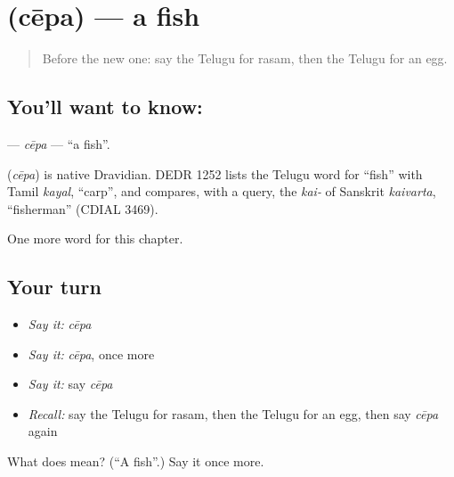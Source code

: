 \section[\texorpdfstring{\te{చేప} (cēpa)}{చేప (cēpa)}]{ (cēpa) — a fish}

\label{lesson:TE-C116-cepa}



\begin{quote}
Before the new one: say the Telugu for rasam, then the Telugu for an egg.
\end{quote}

\subsection*{You'll want to know: }
\textbf{} — \emph{cēpa} — \textquotedblleft{}a fish\textquotedblright{}.

\begin{cousinweb}
\textbf{} (\emph{cēpa}) is native Dravidian. DEDR 1252 lists the Telugu word for \textquotedblleft{}fish\textquotedblright{} with Tamil \emph{kayal}, \textquotedblleft{}carp\textquotedblright{}, and compares, with a query, the \emph{kai-} of Sanskrit \emph{kaivarta}, \textquotedblleft{}fisherman\textquotedblright{} (CDIAL 3469).
\end{cousinweb}

\begin{grammarlens}[title={What you've built}]
One more word for this chapter.
\end{grammarlens}

\subsection*{Your turn}
\begin{itemize}
\raggedright
  \item \emph{Say it:} \emph{cēpa}
  \item \emph{Say it:} \emph{cēpa}, once more
  \item \emph{Say it:} say \emph{cēpa}
  \item \emph{Recall:} say the Telugu for rasam, then the Telugu for an egg, then say \emph{cēpa} again
\end{itemize}

\begin{tcolorbox}[breakable,colback=teal!4,colframe=teal!35!black,title={Before you move on}]
What does  mean? (\textquotedblleft{}A fish\textquotedblright{}.) Say it once more.
\end{tcolorbox}
